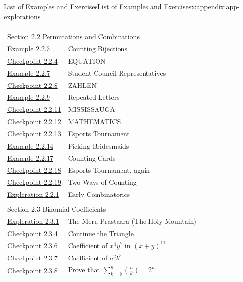 \documentclass[oneside,10pt,]{book}
\numberwithin{equation}{section}
\begin{document}
\begin{appendixptx}{List of Examples and Exercises}{}{List of Examples and Exercises}{}{}{x:appendix:app-explorations}
\begin{longtable}[l]{ll}
\multicolumn{2}{l}{\null}\\[1.5ex] \multicolumn{2}{l}{\large Section 2.2 Permutations and Combinations}\\[0.5ex]
\hyperref[x:example:eg-counting-bijections]{Example 2.2.3}& Counting Bijections\\
\hyperref[x:exercise:ex-counting-EQUATION]{Checkpoint 2.2.4}& EQUATION\\
\hyperref[x:example:eg-counting-student-council]{Example 2.2.7}& Student Council Representatives\\
\hyperref[x:exercise:ex-counting-ZAHLEN]{Checkpoint 2.2.8}& ZAHLEN\\
\hyperref[x:example:eg-counting-YEET]{Example 2.2.9}& Repeated Letters\\
\hyperref[x:exercise:ex-counting-MISSISSAUGA]{Checkpoint 2.2.11}& MISSISSAUGA\\
\hyperref[x:exercise:ex-counting-MATHEMATICS]{Checkpoint 2.2.12}& MATHEMATICS\\
\hyperref[x:exercise:ex-counting-esports]{Checkpoint 2.2.13}& Esports Tournament\\
\hyperref[x:example:eg-counting-bridesmaids]{Example 2.2.14}& Picking Bridesmaids\\
\hyperref[x:example:eg-counting-standard-deck]{Example 2.2.17}& Counting Cards\\
\hyperref[x:exercise:ex-counting-esports-comb]{Checkpoint 2.2.18}& Esports Tournament, again\\
\hyperref[x:exercise:ex-counting-Cnk-two-ways]{Checkpoint 2.2.19}& Two Ways of Counting\\
\hyperref[x:exploration:expl-susruta]{Exploration 2.2.1}& Early Combinatorics\\
\multicolumn{2}{l}{\null}\\[1.5ex] \multicolumn{2}{l}{\large Section 2.3 Binomial Coefficients}\\[0.5ex]
\hyperref[x:exploration:expl-pingala]{Exploration 2.3.1}& The Meru Prastaara (The Holy Mountain)\\
\hyperref[x:exercise:ex-counting-pascal-complete]{Checkpoint 2.3.4}& Continue the Triangle\\
\hyperref[x:exercise:ex-counting-coefficient-1]{Checkpoint 2.3.6}& Coefficient of \(x^4y^7\) in \((x+y)^{11}\)\\
\hyperref[x:exercise:ex-counting-coefficient-2]{Checkpoint 2.3.7}& Coefficient of \(a^2b^3\)\\
\hyperref[x:exercise:ex-counting-binomial-identity]{Checkpoint 2.3.8}& Prove that \(\displaystyle\sum_{k=0}^n \binom{n}{k} = 2^n\)\\

\end{longtable}
\end{appendixptx}
\end{document}
